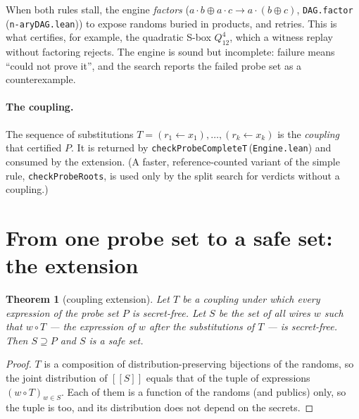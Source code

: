 \documentclass[11pt,a4paper]{article}
\newtheorem{theorem}{Theorem}[section]
\theoremstyle{definition}
\theoremstyle{remark}
\newcommand{\code}[1]{\texttt{\small #1}}
\newcommand{\lean}[2]{\code{#1}\,(\code{#2})}
\begin{document}
When both rules stall, the engine \emph{factors} ($a\cdot b \oplus a\cdot c \to
a\cdot(b\oplus c)$, \lean{DAG.factor}{n-aryDAG.lean}) to expose randoms buried in products,
and retries.  This is what certifies, for example, the quadratic S-box $Q^4_{12}$, which a
witness replay without factoring rejects.  The engine is sound but incomplete: failure means
``could not prove it'', and the search reports the failed probe set as a counterexample.

\paragraph{The coupling.}  The sequence of substitutions $T = (r_1\leftarrow x_1),\dots,
(r_k\leftarrow x_k)$ is the \emph{coupling} that certified $P$.  It is returned by
\lean{checkProbeCompleteT}{Engine.lean} and consumed by the extension.  (A faster,
reference-counted variant of the simple rule, \code{checkProbeRoots}, is used only by the
split search for verdicts without a coupling.)

\section{From one probe set to a safe set: the extension}\label{sec:extension}

\begin{theorem}[coupling extension]\label{thm:extension}
Let $T$ be a coupling under which every expression of the probe set $P$ is secret-free.
Let $S$ be the set of all wires $w$ such that $w\circ T$ --- the expression of $w$ after
the substitutions of $T$ --- is secret-free.  Then $S\supseteq P$ and $S$ is a safe set.
\end{theorem}
\begin{proof}
$T$ is a composition of distribution-preserving bijections of the randoms, so the joint
distribution of $[\![S]\!]$ equals that of the tuple of expressions $(w\circ T)_{w\in S}$.
Each of them is a function of the randoms (and publics) only, so the tuple is too, and its
distribution does not depend on the secrets.
\end{proof}
\end{document}

